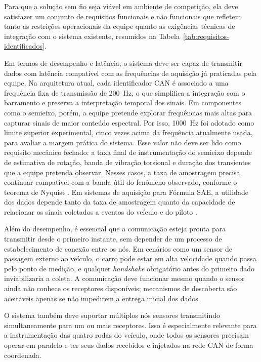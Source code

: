 Para que a solução sem fio seja viável em ambiente de competição, ela deve
satisfazer um conjunto de requisitos funcionais e não funcionais que
refletem tanto as restrições operacionais da equipe quanto as exigências
técnicas de integração com o sistema existente, resumidos na Tabela~\ref{tab:requisitos-identificados}.

Em termos de desempenho e latência, o sistema deve ser capaz de transmitir
dados com latência compatível com as frequências de aquisição já praticadas
pela equipe. Na arquitetura atual, cada identificador CAN é associado a uma
frequência fixa de transmissão de 200~Hz, o que simplifica a
integração com o barramento e preserva a interpretação temporal dos sinais.
Em componentes como o semieixo, porém, a equipe pretende explorar frequências
mais altas para capturar sinais de maior conteúdo espectral. Por isso, 1000~Hz
foi adotado como limite superior experimental, cinco vezes acima da frequência
atualmente usada, para avaliar a margem prática do sistema. Esse valor não deve
ser lido como requisito mecânico fechado: a taxa final de instrumentação do
semieixo depende de estimativa de rotação, banda de vibração torsional e duração
dos transientes que a equipe pretenda observar. Nesses casos, a taxa de amostragem
precisa continuar compatível com a banda útil do fenômeno observado, conforme o
teorema de Nyquist \cite{oppenheim1999_discrete_time_signal_processing}. Em sistemas
de aquisição para Fórmula SAE, a utilidade dos dados depende tanto da taxa de
amostragem quanto da capacidade de relacionar os sinais coletados a eventos do
veículo e do piloto \cite{ashford2020_formula_sae_data_analysis,stoffman2004_low_cost_racing_daq}.

Além do desempenho, é essencial que a comunicação esteja pronta para
transmitir desde o primeiro instante, sem depender de um processo de
estabelecimento de conexão entre os nós. Em cenários como um sensor de
passagem externo ao veículo, o carro pode estar em alta velocidade quando
passa pelo ponto de medição, e qualquer \emph{handshake} obrigatório antes do
primeiro dado inviabilizaria a coleta. A comunicação deve funcionar mesmo
quando o sensor ainda não conhece os receptores disponíveis; mecanismos de
descoberta são aceitáveis apenas se não impedirem a entrega inicial dos dados.

O sistema também deve suportar múltiplos nós sensores transmitindo
simultaneamente para um ou mais receptores. Isso é especialmente relevante
para a instrumentação das quatro rodas do veículo, onde todos os sensores
precisam operar em paralelo e ter seus dados recebidos e injetados na rede
CAN de forma coordenada.

